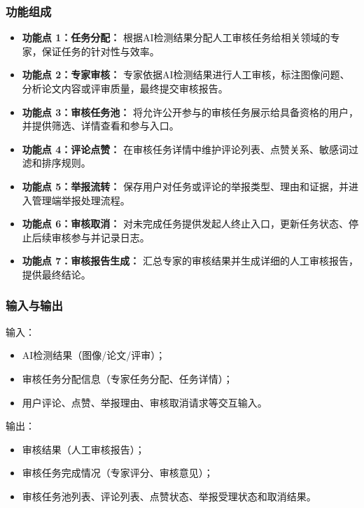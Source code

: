 \subsubsection{功能组成}
\begin{itemize}[leftmargin=2em]
    \item \textbf{功能点 1：任务分配：} 根据AI检测结果分配人工审核任务给相关领域的专家，保证任务的针对性与效率。
    \item \textbf{功能点 2：专家审核：} 专家依据AI检测结果进行人工审核，标注图像问题、分析论文内容或评审质量，最终提交审核报告。
    \item \textbf{功能点 3：审核任务池：} 将允许公开参与的审核任务展示给具备资格的用户，并提供筛选、详情查看和参与入口。
    \item \textbf{功能点 4：评论点赞：} 在审核任务详情中维护评论列表、点赞关系、敏感词过滤和排序规则。
    \item \textbf{功能点 5：举报流转：} 保存用户对任务或评论的举报类型、理由和证据，并进入管理端举报处理流程。
    \item \textbf{功能点 6：审核取消：} 对未完成任务提供发起人终止入口，更新任务状态、停止后续审核参与并记录日志。
    \item \textbf{功能点 7：审核报告生成：} 汇总专家的审核结果并生成详细的人工审核报告，提供最终结论。
\end{itemize}

\subsubsection{输入与输出}
输入：
\begin{itemize}[leftmargin=2em]
    \item AI检测结果（图像/论文/评审）；
    \item 审核任务分配信息（专家任务分配、任务详情）；
    \item 用户评论、点赞、举报理由、审核取消请求等交互输入。
\end{itemize}

输出：
\begin{itemize}[leftmargin=2em]
    \item 审核结果（人工审核报告）；
    \item 审核任务完成情况（专家评分、审核意见）；
    \item 审核任务池列表、评论列表、点赞状态、举报受理状态和取消结果。
\end{itemize}

